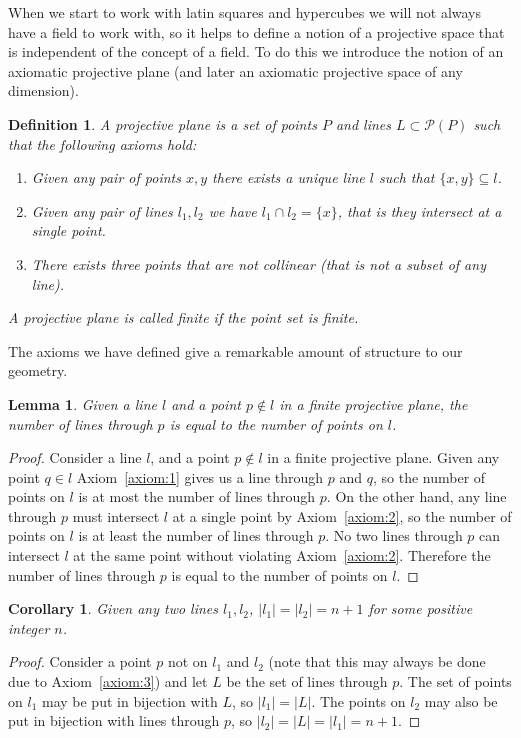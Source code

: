 \documentclass{article}
\newtheorem{lemma}{Lemma}
\newtheorem{corollary}{Corollary}
\newtheorem{definition}{Definition}
\begin{document}
When we start to work with latin squares and hypercubes we will not always have a field to work with, so it helps to define a notion of a projective space that is independent of the concept of a field. To do this we introduce the notion of an axiomatic projective plane (and later an axiomatic projective space of any dimension).

\begin{definition}
  A \textit{projective plane} is a set of points \(P\) and lines \(L \subset \mathcal{P}(P)\) such that the following axioms hold:

  \begin{enumerate}
    \item Given any pair of points \(x, y\) there exists a unique line \(l\) such that \(\{x, y\} \subseteq l\).\label{axiom:1}
    \item Given any pair of lines \(l_1, l_2\) we have \(l_1 \cap l_2 = \{x\}\), that is they intersect at a single point.\label{axiom:2}
    \item There exists three points that are not collinear (that is not a subset of any line).\label{axiom:3}
  \end{enumerate}

  A projective plane is called finite if the point set is finite.
\end{definition}


The axioms we have defined give a remarkable amount of structure to our geometry.

\begin{lemma}
  Given a line \(l\) and a point \(p \notin l\) in a finite projective plane, the number of lines through \(p\) is equal to the number of points on \(l\).
\end{lemma}
\begin{proof}
  Consider a line \(l\), and a point \(p \notin l\) in a finite projective plane. Given any point \(q \in l\) Axiom~\ref{axiom:1} gives us a line through \(p\) and \(q\), so the number of points on \(l\) is at most the number of lines through \(p\). On the other hand,
  any line through \(p\) must intersect \(l\) at a single point by Axiom~\ref{axiom:2}, so the number of points on \(l\) is at least the number of lines through \(p\). No two lines through \(p\) can intersect \(l\) at the same point without violating Axiom~\ref{axiom:2}. Therefore the number of lines through \(p\) is equal to the number of points on \(l\).
\end{proof}

\begin{corollary}
  Given any two lines \(l_1, l_2\), \(|l_1| = |l_2| = n + 1\) for some positive integer \(n\).
\end{corollary}
\begin{proof}
  Consider a point \(p\) not on \(l_1\) and \(l_2\) (note that this may always be done due to Axiom~\ref{axiom:3}) and let \(L\) be the set of lines through \(p\). The set of points on \(l_{1}\) may be put in bijection with \(L\), so \(|l_{1}| = |L|\). The points on \(l_2\) may also be put in bijection with lines through \(p\),
  so \(|l_2| = |L| = |l_1| = n + 1\).
\end{proof}
\end{document}
